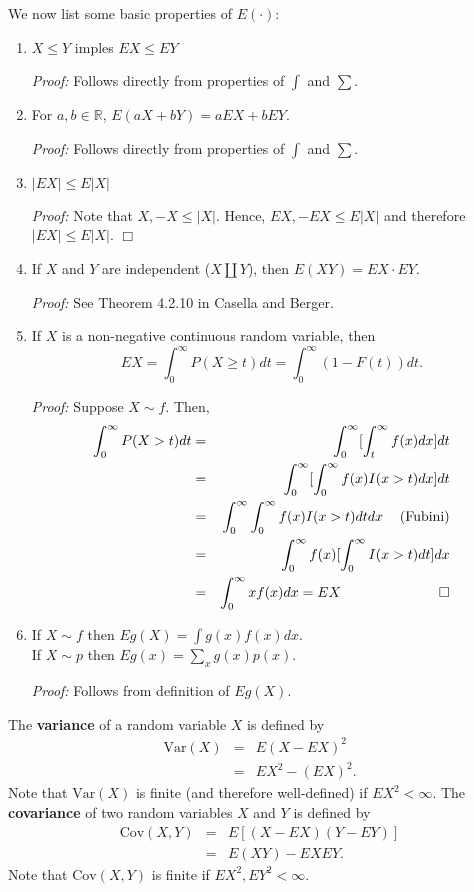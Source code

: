 \documentclass[12pt,oneside]{article}
\begin{document}
\noindent We now list some basic properties of $E(\cdot)$:
\begin{enumerate}
\item  $X \leq Y$ imples $EX \leq EY$

\emph{Proof:}  Follows directly from properties of $\int$ and $\sum$.

\item For $a,b \in \mathbb{R}$, $E(aX + bY) = a EX + b EY$.

\emph{Proof:}  Follows directly from properties of $\int$ and $\sum$.

\item $|EX| \leq E|X|$

\emph{Proof:} Note that $X, -X \leq |X|$.  Hence, $EX, -EX \leq E|X|$ and therefore $|EX| \leq E|X|$. $\Box$

\item If $X$ and $Y$ are independent ($X \coprod Y$), then $E(XY) = EX \cdot EY$.

\emph{Proof:} See Theorem 4.2.10 in Casella and Berger.

\item If $X$ is a non-negative continuous random variable, then
 $$EX = \int_0^\infty P(X \geq t) dt = \int_0^\infty (1-F(t)) dt.$$

\emph{Proof:} Suppose $X \sim f$.  Then,
\begin{eqnarray*} \int_0^\infty P(X>t) dt &=& \int_0^\infty [\int_t^\infty f(x) dx] dt \\
	&=& \int_0^\infty [ \int_0^\infty f(x) I(x>t) dx] dt \\
	&=&  \int_0^\infty \int_0^\infty f(x) I(x>t) dt dx \hspace{12 pt} \mbox{(Fubini)} \\
	&=& \int_0^\infty f(x) [ \int_0^\infty I(x>t) dt] dx \\
	&=& \int_0^\infty x f(x) dx = EX \hspace{70 pt}\Box \end{eqnarray*}
	
\item If $X \sim f$ then $Eg(X) = \int g(x) f(x) dx$. \\
If $X \sim p$ then $Eg(x)  = \underset{x}{\sum} g(x) p(x) $.
	
\emph{Proof:} Follows from definition of $Eg(X)$.
\end{enumerate}

\noindent The \textbf{variance} of a random variable $X$ is defined by
\begin{eqnarray*} \mbox{Var}(X) &=& E(X-EX)^2 \\ &=& EX^2 - (EX)^2 . \end{eqnarray*}
Note that $\mbox{Var}(X)$ is finite (and therefore well-defined) if $EX^2 < \infty$.
The \textbf{covariance} of two random variables $X$ and $Y$ is defined by
\begin{eqnarray*} \mbox{Cov}(X,Y) &=& E[(X-EX)(Y-EY)] \\ &=& E(XY) - EXEY. \end{eqnarray*}
Note that $\mbox{Cov}(X,Y) $ is finite if $EX^2, EY^2 < \infty$. \\
\end{document}
